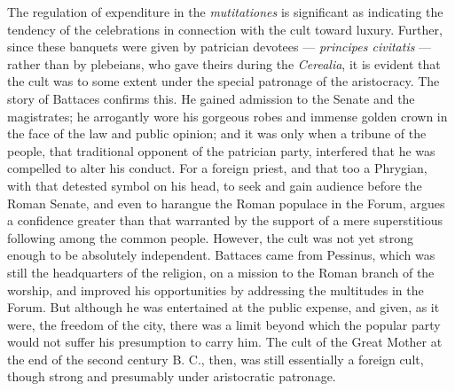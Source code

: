 \documentclass[a4paper, 11pt, oneside, polutonikogreek, english]{article}
\begin{document}
The regulation of expenditure in the \emph{mutitationes} is significant as indicating the tendency of the celebrations in connection with the cult toward luxury. Further, since these banquets were given by patrician devotees --- \emph{principes civitatis} --- rather than by plebeians, who gave theirs during the \emph{Cerealia}, it is evident that the cult was to some extent under the special patronage of the aristocracy. The story of Battaces confirms this. He gained admission to the Senate and the magistrates; he arrogantly wore his gorgeous robes and immense golden crown in the face of the law and public opinion; and it was only when a tribune of the people, that traditional opponent of the patrician party, interfered that he was compelled to alter his conduct. For a foreign priest, and that too a Phrygian, with that detested symbol on his head, to seek and gain audience before the Roman Senate, and even to harangue the Roman populace in the Forum, argues a confidence greater than that warranted by the support of a mere superstitious following among the common people. However, the cult was not yet strong enough to be absolutely independent. Battaces came from Pessinus, which was still the headquarters of the religion, on a mission to the Roman branch of the worship, and improved his opportunities by addressing the multitudes in the Forum. But although he was entertained at the public expense, and given, as it were, the freedom of the city, there was a limit beyond which the popular party would not suffer his presumption to carry him. The cult of the Great Mother at the end of the second century B. C., then, was still essentially a foreign cult, though strong and presumably under aristocratic patronage.
\end{document}
